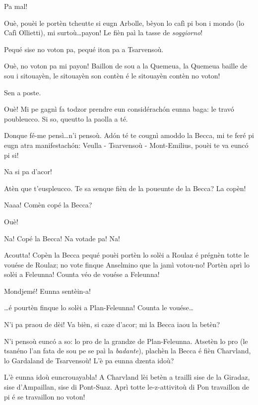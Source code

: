\begin{drama}
\Ronnyspeaks Pa mal!

\Laurentspeaks Ouè, pouèi le portèn tcheutte si eugn Arbolle, bèyon lo cafì pi bon i mondo (lo Cafì Ollietti), mi surtoù\ldots payon! Le fièn paì la tasse de \textit{soggiorno}!

\Ronnyspeaks Pequé sise no voton pa, pequé iton pa a Tsarvensoù.

\Laurentspeaks Ouè, no voton pa mi payon! Baillon de sou a la Quemeua, la Quemeua baille de sou i sitouayèn, le sitouayèn son contèn é le sitouayèn contèn no voton!

\Ronnyspeaks Sen a poste.

\Laurentspeaks Ouè! Mi pe gagnì fa todzor prendre eun considérach\'on eunna baga: le trav\'o poubleucco. Si so, queutto la paolla a té.

\Ronnyspeaks Donque fé-me pensì\ldots n'i pensoù. Ad\'on té te cougnì amoddo la Becca, mi te feré pi eugn atra manifestach\'on: Veulla - Tsarvensoù - Mont-Emilius, pouèi te va euncó pi si!

\Laurentspeaks Na si pa d'acor!

\Ronnyspeaks Atèn que t'euspleucco. Te sa senque fièn de la poueunte de la Becca?  La copèn!

\Laurentspeaks Naaa! Comèn copé la Becca?

\Ronnyspeaks Ouè!

\Laurentspeaks {} Na! Copé la Becca! Na votade pa! Na!

\Ronnyspeaks Acoutta! Copèn la Becca pequé pouèi portèn lo solèi a Roulaz é prégnèn totte le vouése de Roulaz; no vote finque Anselmino que la jamì votou-no! Portèn aprì lo solèi a Feleunna! Counta véo de vouése a Feleunna!

\Laurentspeaks Mondjemé! Eunna sentèin-a!

\Ronnyspeaks \ldots é pourtèn finque lo solèi a Plan-Feleunna! Counta le vouése\ldots

\Laurentspeaks N'i pa praou de dèi! Va bièn, si caze d'acor; mi la Becca iaou la betèn?

\Ronnyspeaks N'i pensoù euncó a so: lo pro de la grandze de Plan-Feleunna. Atsetèn lo pro (le tsanéno l'an fata de sou pe se paì la \textit{badante}), plachèn la Becca é fièn Charvland, lo Gardaland de Tsarvensoù! L'è pa eunna dzenta idoù?

\Laurentspeaks L'è eunna idoù euncrouayabla! A Charvland lèi betèn a traillì sise de la Giradaz, sise d'Ampaillan, sise di Pont-Suaz. Aprì totte le-z-attivitoù di Pon travaillon de pi é se travaillon no voton!


\end{drama}
